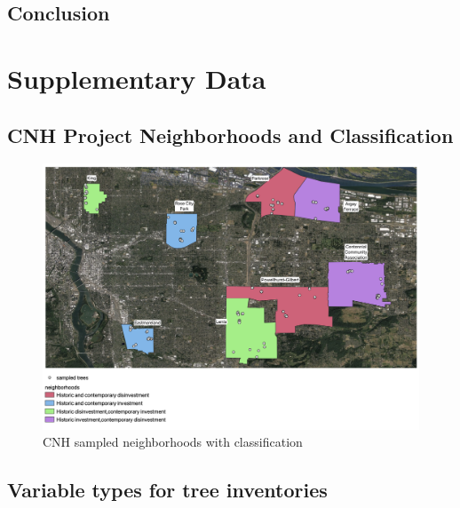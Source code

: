 \documentclass[12pt,twoside]{reedthesis}
\begin{document}
\hypertarget{conclusion}{%
\section{Conclusion}\label{conclusion}}

\appendix

\hypertarget{data}{%
\chapter{Supplementary Data}\label{data}}

\hypertarget{cnh-project-neighborhoods-and-classification}{%
\section*{CNH Project Neighborhoods and Classification}\label{cnh-project-neighborhoods-and-classification}}
\begin{figure}

{\centering \includegraphics[width=1\linewidth]{figure/neighborhoods_and_trees2} 

}

\caption{CNH sampled neighborhoods with classification}\label{fig:neighborhoods}
\end{figure}
\hypertarget{variable-types-for-tree-inventories}{%
\section*{Variable types for tree inventories}\label{variable-types-for-tree-inventories}}
\end{document}
